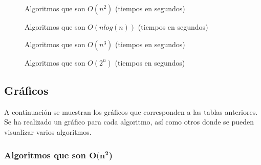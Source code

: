 \documentclass[11pt]{article}
\begin{document}
\floydlinuxOCero
{}\hanoilinuxOCero

 {\floydlinuxOCero}
 {\hanoilinuxOCero}

\begin{figure}[H]
	\centering
	\caption*{Algoritmos que son $O(n^2)$ (tiempos en segundos)}
	\pgfplotstabletypeset[columns={0, Burbuja, Selección, Inserción}]{\burbujalinuxOCero}
\end{figure}


\begin{figure}[H]
	\centering
	\caption*{Algoritmos que son $O(nlog(n))$ (tiempos en segundos)}
	\pgfplotstabletypeset[columns={0, Mergesort, Quicksort, Heapsort}]{\mergesortlinuxOCero}
\end{figure}

\begin{figure}[H]
	\centering
	\caption*{Algoritmos que son $O(n^3)$ (tiempos en segundos)}
	\pgfplotstabletypeset[columns={0, Floyd}]{\floydlinuxOCero}
\end{figure}


\begin{figure}[H]
	\centering
	\caption*{Algoritmos que son $O(2^n)$ (tiempos en segundos)}
	\pgfplotstabletypeset[columns={0, Hanoi}]{\hanoilinuxOCero}
\end{figure}


    
\subsection*{Gráficos}

A continuación se muestran los gráficos que corresponden a las tablas anteriores. Se ha realizado un gráfico para cada algoritmo, así como otros donde se pueden visualizar varios algoritmos.

\subsubsection*{Algoritmos que son $\boldsymbol{O(n^2}$)}

\begin{center}
	
\end{center}


\begin{center}
	
\end{center}
\end{document}
